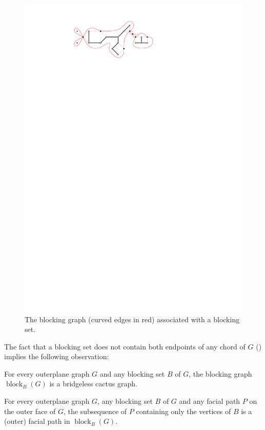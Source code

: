\documentclass{patmorin}
\DeclareMathOperator{\block}{block}
\begin{document}
\begin{figure}
  \begin{center}
     \includegraphics{figs/blocking-set-2}
  \end{center}
  \caption{The blocking graph (curved edges in red) associated with a
           blocking set.}
\end{figure}

The fact that a blocking set does not contain both endpoints of any
chord of $G$ () implies the following observation:

\begin{obs}
   For every outerplane graph $G$ and any blocking set $B$ of $G$,
   the blocking graph $\block_B(G)$ is a bridgeless cactus graph.
\end{obs}

\begin{obs}
  For every outerplane graph $G$, any blocking set $B$ of $G$ and any
  facial path $P$ on the outer face of  $G$, the subsequence of $P$
  containing only the vertices of $B$ is a (outer) facial path in
  $\block_B(G)$.
\end{obs}
\end{document}
